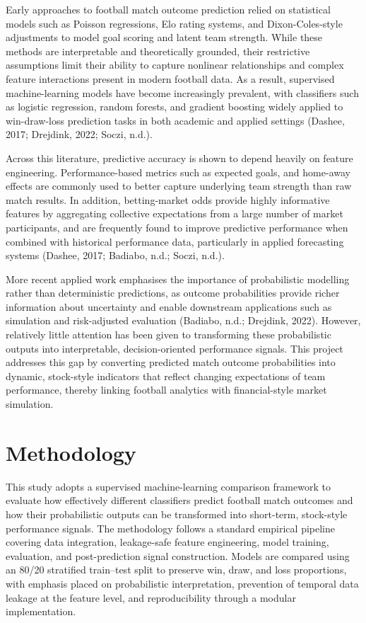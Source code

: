 \documentclass[11pt,a4paper]{article}
\begin{document}
Early approaches to football match outcome prediction relied on statistical models such as Poisson regressions, Elo rating systems, and Dixon-Coles-style adjustments to model goal scoring and latent team strength. While these methods are interpretable and theoretically grounded, their restrictive assumptions limit their ability to capture nonlinear relationships and complex feature interactions present in modern football data. As a result, supervised machine-learning models have become increasingly prevalent, with classifiers such as logistic regression, random forests, and gradient boosting widely applied to win-draw-loss prediction tasks in both academic and applied settings (Dashee, 2017; Drejdink, 2022; Soczi, n.d.).

Across this literature, predictive accuracy is shown to depend heavily on feature engineering. Performance-based metrics such as expected goals, and home-away effects are commonly used to better capture underlying team strength than raw match results. In addition, betting-market odds provide highly informative features by aggregating collective expectations from a large number of market participants, and are frequently found to improve predictive performance when combined with historical performance data, particularly in applied forecasting systems (Dashee, 2017; Badiabo, n.d.; Soczi, n.d.).

More recent applied work emphasises the importance of probabilistic modelling rather than deterministic predictions, as outcome probabilities provide richer information about uncertainty and enable downstream applications such as simulation and risk-adjusted evaluation (Badiabo, n.d.; Drejdink, 2022). However, relatively little attention has been given to transforming these probabilistic outputs into interpretable, decision-oriented performance signals. This project addresses this gap by converting predicted match outcome probabilities into dynamic, stock-style indicators that reflect changing expectations of team performance, thereby linking football analytics with financial-style market simulation.


\section{Methodology}
\label{sec:methodology}

This study adopts a supervised machine-learning comparison framework to evaluate how effectively different classifiers predict football match outcomes and how their probabilistic outputs can be transformed into short-term, stock-style performance signals. The methodology follows a standard empirical pipeline covering data integration, leakage-safe feature engineering, model training, evaluation, and post-prediction signal construction. Models are compared using an 80/20 stratified train–test split to preserve win, draw, and loss proportions, with emphasis placed on probabilistic interpretation, prevention of temporal data leakage at the feature level, and reproducibility through a modular implementation.
\end{document}
